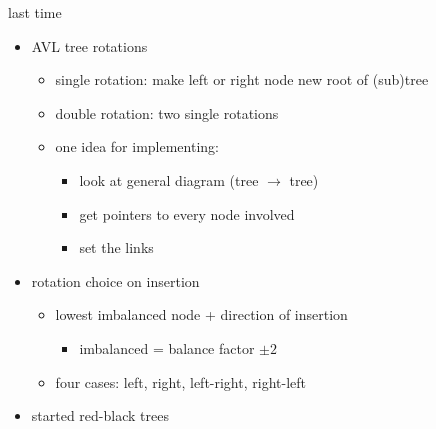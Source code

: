 \begin{comment}
\begin{frame}{last time}
    \begin{itemize}
    \item rules of thumb for determining/comparing big-oh
        \begin{itemize}
            \item logs are all the same
            \item polynomial < exponential
            \item loops outside in
        \end{itemize}
    \item common big-oh classes --- constant/linear/quadratic/\ldots
        \begin{itemize}
            \item log --- binary search
            \item linear --- search every item
            \item \ldots
        \end{itemize}
    \item started motivation for trees
    \end{itemize}
\end{frame}
\end{comment}

\begin{frame}{last time}
    \begin{itemize}
    \item AVL tree rotations
        \begin{itemize}
        \item single rotation: make left or right node new root of (sub)tree
        \item double rotation: two single rotations
        \item one idea for implementing:
            \begin{itemize}
            \item look at general diagram (tree $\rightarrow$ tree)
            \item get pointers to every node involved
            \item set the links
            \end{itemize}
        \end{itemize}
    \item rotation choice on insertion
        \begin{itemize}
        \item lowest imbalanced node + direction of insertion
        \begin{itemize}\item imbalanced = balance factor $\pm 2$\end{itemize}
        \item four cases: left, right, left-right, right-left
        \end{itemize}
    \item started red-black trees
    \end{itemize}
\end{frame}
